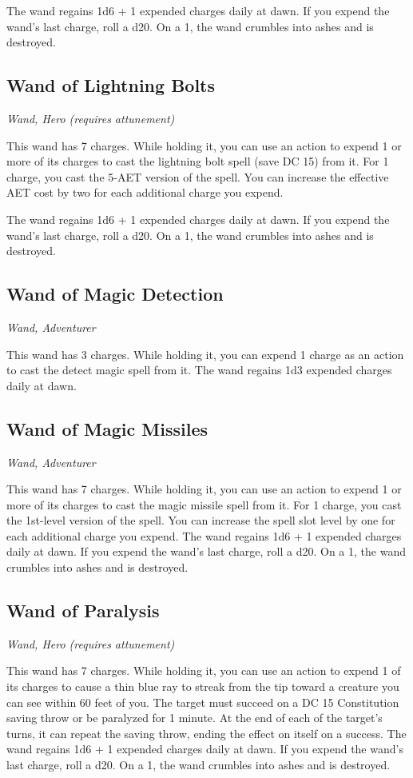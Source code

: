 The wand regains 1d6 + 1 expended charges daily at dawn. If you expend the wand's last charge, roll a d20. On a 1, the wand crumbles into ashes and is destroyed.

\subsection{Wand of Lightning Bolts}
\textit{Wand, Hero (requires attunement)}

This wand has 7 charges. While holding it, you can use an action to expend 1 or more of its charges to cast the lightning bolt spell (save DC 15) from it. For 1 charge, you cast the 5-AET version of the spell. You can increase the effective AET cost by two for each additional charge you expend.

The wand regains 1d6 + 1 expended charges daily at dawn. If you expend the wand's last charge, roll a d20. On a 1, the wand crumbles into ashes and is destroyed.

\subsection{Wand of Magic Detection}
\textit{Wand, Adventurer}

This wand has 3 charges. While holding it, you can expend 1 charge as an action to cast the detect magic spell from it. The wand regains 1d3 expended charges daily at dawn.

\subsection{Wand of Magic Missiles}
\textit{Wand, Adventurer} 

This wand has 7 charges. While holding it, you can use an action to expend 1 or more of its charges to cast the magic missile spell from it. For 1 charge, you cast the 1st-level version of the spell. You can increase the spell slot level by one for each additional charge you expend. The wand regains 1d6 + 1 expended charges daily at dawn. If you expend the wand's last charge, roll a d20. On a 1, the wand crumbles into ashes and is destroyed.

\subsection{Wand of Paralysis}
\textit{Wand, Hero (requires attunement)} 

This wand has 7 charges. While holding it, you can use an action to expend 1 of its charges to cause a thin blue ray to streak from the tip toward a creature you can see within 60 feet of you. The target must succeed on a DC 15 Constitution saving throw or be paralyzed for 1 minute. At the end of each of the target's turns, it can repeat the saving throw, ending the effect on itself on a success.  The wand regains 1d6 + 1 expended charges daily at dawn. If you expend the wand's last charge, roll a d20. On a 1, the wand crumbles into ashes and is destroyed.

